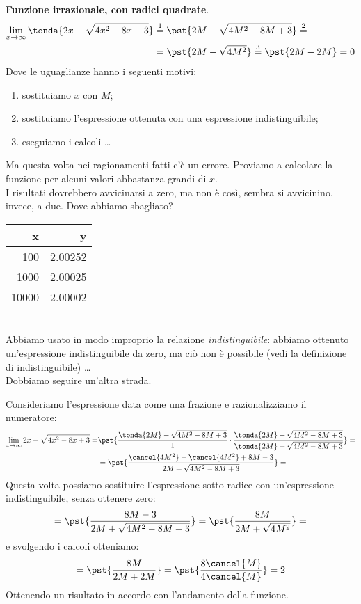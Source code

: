 \begin{esempio}
\textbf{Funzione irrazionale, con radici quadrate}.
\begin{align*}
\lim_{x \rightarrow \infty} \tonda{2x-\sqrt{4x^2-8x+3}} & \stackrel{1}{=} 
  \pst{2M-\sqrt{4M^2-8M+3}} \stackrel{2}{=} \\
  &=\pst{2M-\sqrt{4M^2}} \stackrel{3}{=} 
  \pst{2M-2M} = 0
\end{align*}
Dove le uguaglianze hanno i seguenti motivi:
\begin{enumerate} [nosep]
 \item sostituiamo \(x\) con \(M\);
 \item sostituiamo l'espressione ottenuta con una espressione 
   indistinguibile;
 \item eseguiamo i calcoli \dots
\end{enumerate}
\vspace{1em}
\begin{minipage}{.69\textwidth}
Ma questa volta nei ragionamenti fatti c'è un errore. Proviamo a calcolare 
la funzione per alcuni valori abbastanza grandi di \(x\).\\
I risultati dovrebbero avvicinarsi a zero, ma non è così, sembra si 
avvicinino, invece, a due. Dove abbiamo sbagliato?
\end{minipage}
\begin{minipage}{.39\textwidth}
\begin{center}
\begin{tabular}{r|r}
x & y\\\hline
100 & 2.00252 \\
1000 & 2.00025 \\
10000 & 2.00002 \\
\end{tabular}
\end{center}
\end{minipage}\\

Abbiamo usato in modo improprio la relazione \emph{indistinguibile}: 
abbiamo ottenuto un'espressione indistinguibile da zero, ma ciò non è 
possibile (vedi la definizione di indistinguibile) \dots \\
Dobbiamo seguire un'altra strada.

Consideriamo l'espressione data come una frazione e razionalizziamo il 
numeratore:
\begin{align*}
\lim_{x \rightarrow \infty} 2x-\sqrt{4x^2-8x+3}=
&\pst{\frac{\tonda{2M}-\sqrt{4M^2-8M+3}}{1} \cdot 
\frac{\tonda{2M}+\sqrt{4M^2-8M+3}}{\tonda{2M}+\sqrt{4M^2-8M+3}}}=\\
&=\pst{\frac{\cancel{4M^2}-\cancel{4M^2}+8M-3}{2M+\sqrt{4M^2-8M+3}}}=
\end{align*}
Questa volta possiamo sostituire l'espressione sotto radice con 
un'espressione indistinguibile, senza ottenere zero:
\[=\pst{\frac{8M-3}{2M+\sqrt{4M^2-8M+3}}} =
   \pst{\frac{8M}{2M+\sqrt{4M^2}}}=\]
e svolgendo i calcoli otteniamo:
\[=\pst{\frac{8M}{2M+2M}}=
   \pst{\frac{8\cancel{M}}{4\cancel{M}}} = 2\]
Ottenendo un risultato in accordo con l'andamento della funzione.
\end{esempio}

